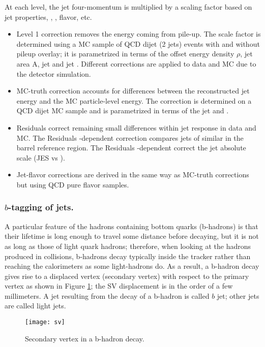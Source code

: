 At each level, the jet four-momentum is multiplied by a scaling factor based on jet properties, \ie, \etac, flavor, etc.

\begin{itemize}
\item Level 1 correction removes the energy coming from pile-up. The scale factor is determined using a MC sample of QCD dijet (2 jets) events with and without pileup overlay; it is parametrized in terms of the offset energy density $\rho$, jet area A, jet \etac and jet \pt. Different corrections are applied to data and MC due to the detector simulation.
\item MC-truth correction accounts for differences between the reconstructed jet energy and the MC particle-level energy. The correction is determined on a QCD dijet MC sample and is parametrized in terms of the jet \pt and \etac.
\item Residuals correct remaining small differences within jet response in data and MC. The Residuals \etac-dependent correction compares jets of similar \pt in the barrel reference region. The Residuals \pt-dependent correct the jet absolute scale (JES vs \pt).
\item Jet-flavor corrections are derived in the same way as MC-truth corrections but using QCD pure flavor samples. 
\end{itemize}  

\subsubsection*{$b$-tagging of jets.}

A particular feature of the hadrons containing bottom quarks (b-hadrons) is that their lifetime is long enough to travel some distance before decaying, but it is not as long as those of light quark hadrons; therefore, when looking at the hadrons produced in \pp collisions, b-hadrons decay typically inside the tracker rather than reaching the calorimeters as some light-hadrons do. As a result, a b-hadron decay gives rise to a displaced vertex (secondary vertex) with respect to the primary vertex as shown in Figure \ref{fig:sv}; the SV displacement is in the order of a few millimeters. A jet resulting from the decay of a b-hadron is called $b$ jet; other jets are called light jets. 

\begin{figure}[!h]
  \centering
  \texttt{[image: sv]}
  \caption[Secondary vertex in a b-hadron decay.]{Secondary vertex in a b-hadron decay.}\label{fig:sv}
\end{figure}

